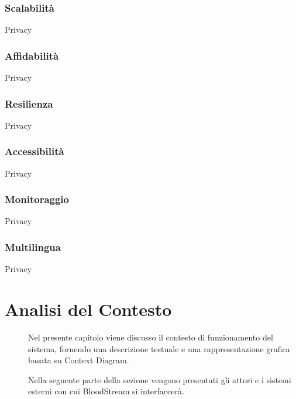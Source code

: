 \documentclass{article}
\begin{document}
\subsubsection{Scalabilità}\label{rnf_3}
\begin{description}
    \item Privacy
\end{description}

\subsubsection{Affidabilità}\label{rnf_4}
\begin{description}
    \item Privacy
\end{description}

\subsubsection{Resilienza}\label{rnf_5}
\begin{description}
    \item Privacy
\end{description}

\subsubsection{Accessibilità}\label{rnf_6}
\begin{description}
    \item Privacy
\end{description}

\subsubsection{Monitoraggio}\label{rnf_7}
\begin{description}
    \item Privacy
\end{description}

\subsubsection{Multilingua}\label{rnf_8}
\begin{description}
    \item Privacy
\end{description}

\clearpage

\section{Analisi del Contesto}
\begin{description}
    \item[] Nel presente capitolo viene discusso il contesto di funzionamento del sistema, fornendo una descrizione testuale e una rappresentazione grafica basata su Context Diagram.

    Nella seguente parte della sezione vengono presentati gli attori e i sistemi esterni con cui BloodStream si interfaccerà. 
\end{description}
\end{document}
